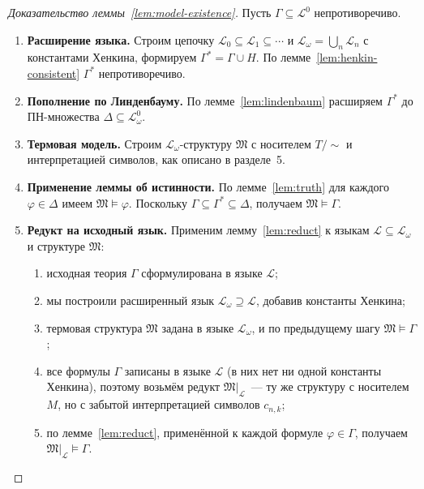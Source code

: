\documentclass[12pt, a4paper]{article}
\theoremstyle{plain}
\theoremstyle{definition}
\renewcommand{\models}{\vDash}
\newcommand{\Lang}{\mathcal{L}}
\newcommand{\Lw}{\mathcal{L}_\omega}
\newcommand{\Struct}{\mathfrak{M}}
\begin{document}
\begin{proof}[Доказательство леммы~\ref{lem:model-existence}]
Пусть $\Gamma \subseteq \Lang^0$ непротиворечиво.

\begin{enumerate}[label=\textbf{Шаг \arabic*.}, leftmargin=*, itemsep=4pt]
  \item \textbf{Расширение языка.}
        Строим цепочку $\Lang_0 \subseteq \Lang_1 \subseteq \cdots$
        и $\Lw = \bigcup_n \Lang_n$ с константами Хенкина,
        формируем $\Gamma^* = \Gamma \cup H$.
        По лемме~\ref{lem:henkin-consistent} $\Gamma^*$ непротиворечиво.

  \item \textbf{Пополнение по Линденбауму.}
        По лемме~\ref{lem:lindenbaum} расширяем $\Gamma^*$
        до ПН-множества $\Delta \subseteq \Lw^0$.

  \item \textbf{Термовая модель.}
        Строим $\Lw$-структуру $\Struct$ с носителем $T/{\sim}$
        и интерпретацией символов, как описано в разделе~5.

  \item \textbf{Применение леммы об истинности.}
        По лемме~\ref{lem:truth} для каждого $\varphi \in \Delta$
        имеем $\Struct \models \varphi$.
        Поскольку $\Gamma \subseteq \Gamma^* \subseteq \Delta$,
        получаем $\Struct \models \Gamma$.

  \item \textbf{Редукт на исходный язык.}
        Применим лемму~\ref{lem:reduct} к языкам $\Lang \subseteq \Lw$ и
        структуре $\Struct$:
        \begin{enumerate}[label=(\alph*)]
          \item исходная теория $\Gamma$ сформулирована в языке $\Lang$;
          \item мы построили расширенный язык $\Lw \supseteq \Lang$,
                добавив константы Хенкина;
          \item термовая структура $\Struct$ задана в языке $\Lw$, и
                по предыдущему шагу $\Struct \models \Gamma$;
          \item все формулы $\Gamma$ записаны в языке $\Lang$ (в них нет
                ни одной константы Хенкина), поэтому возьмём редукт
                $\Struct|_{\Lang}$~--- ту же структуру с носителем $M$,
                но с забытой интерпретацией символов $c_{n,k}$;
          \item по лемме~\ref{lem:reduct}, применённой к каждой формуле
                $\varphi \in \Gamma$, получаем $\Struct|_{\Lang} \models \Gamma$.
        \end{enumerate}
\end{enumerate}
\end{proof}
\end{document}
